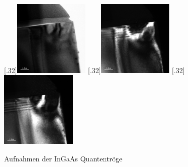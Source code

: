 \documentclass[a4paper,11pt,DIV=11]{scrartcl}
\begin{document}
\begin{figure}[htb]\centering
	[.32\linewidth]{\includegraphics[width=0.32\textwidth]{Versuchsdaten/10/hell.jpg}}
	[.32\linewidth]{\includegraphics[width=0.32\textwidth]{Versuchsdaten/10/004-dunkel.jpg}}
	[.32\linewidth]{\includegraphics[width=0.32\textwidth]{Versuchsdaten/10/022-dunkel.jpg}}
	\caption{Aufnahmen der InGaAs Quantentröge} \label{dunkelhell}
\end{figure}
\end{document}
